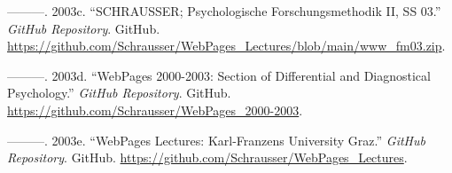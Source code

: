 \documentclass[
]{article}
\newlength{\cslhangindent}
\newlength{\cslentryspacingunit} %
\newenvironment{CSLReferences}[2] %
 {%
  \setlength{\parindent}{0pt}
  \ifodd #1
  \let\oldpar\par
  \def\par{\hangindent=\cslhangindent\oldpar}
  \fi
  \setlength{\parskip}{#2\cslentryspacingunit}
 }%
 {}
\begin{document}
\begin{CSLReferences}{1}{0}
\leavevmode{}%
---------. 2003c. {``{SCHRAUSSER; Psychologische Forschungsmethodik II,
SS 03}.''} \emph{GitHub Repository}. GitHub.
\url{https://github.com/Schrausser/WebPages_Lectures/blob/main/www_fm03.zip}.

\leavevmode{}%
---------. 2003d. {``WebPages 2000-2003: Section of Differential and
Diagnostical Psychology.''} \emph{GitHub Repository}. GitHub.
\url{https://github.com/Schrausser/WebPages_2000-2003}.

\leavevmode{}%
---------. 2003e. {``{WebPages Lectures: Karl-Franzens University
Graz}.''} \emph{GitHub Repository}. GitHub.
\url{https://github.com/Schrausser/WebPages_Lectures}.

\end{CSLReferences}
\end{document}
